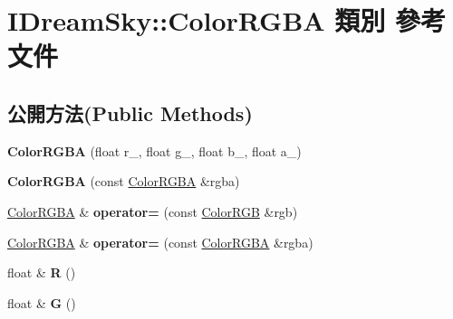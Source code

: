 \hypertarget{class_i_dream_sky_1_1_color_r_g_b_a}{}\section{I\+Dream\+Sky\+:\+:Color\+R\+G\+BA 類別 參考文件}
\label{class_i_dream_sky_1_1_color_r_g_b_a}
\subsection*{公開方法(Public Methods)}
\begin{DoxyCompactItemize}
\item 
{\bfseries Color\+R\+G\+BA} (float r\+\_, float g\+\_, float b\+\_, float a\+\_)\hypertarget{class_i_dream_sky_1_1_color_r_g_b_a_a296f9c79c535b7221eddbcc1decaf15a}{}\label{class_i_dream_sky_1_1_color_r_g_b_a_a296f9c79c535b7221eddbcc1decaf15a}

\item 
{\bfseries Color\+R\+G\+BA} (const \hyperlink{class_i_dream_sky_1_1_color_r_g_b_a}{Color\+R\+G\+BA} \&rgba)\hypertarget{class_i_dream_sky_1_1_color_r_g_b_a_aae8dea40c9c169a5a9e8df856fdfc714}{}\label{class_i_dream_sky_1_1_color_r_g_b_a_aae8dea40c9c169a5a9e8df856fdfc714}

\item 
\hyperlink{class_i_dream_sky_1_1_color_r_g_b_a}{Color\+R\+G\+BA} \& {\bfseries operator=} (const \hyperlink{class_i_dream_sky_1_1_color_r_g_b}{Color\+R\+GB} \&rgb)\hypertarget{class_i_dream_sky_1_1_color_r_g_b_a_aac80b182c20e5e2b68d3495d078f1b3c}{}\label{class_i_dream_sky_1_1_color_r_g_b_a_aac80b182c20e5e2b68d3495d078f1b3c}

\item 
\hyperlink{class_i_dream_sky_1_1_color_r_g_b_a}{Color\+R\+G\+BA} \& {\bfseries operator=} (const \hyperlink{class_i_dream_sky_1_1_color_r_g_b_a}{Color\+R\+G\+BA} \&rgba)\hypertarget{class_i_dream_sky_1_1_color_r_g_b_a_a6842401a78acc9e6f34cbe0cb7dbe526}{}\label{class_i_dream_sky_1_1_color_r_g_b_a_a6842401a78acc9e6f34cbe0cb7dbe526}

\item 
float \& {\bfseries R} ()\hypertarget{class_i_dream_sky_1_1_color_r_g_b_a_aee0873a7fdfbf2fc3b6fd989bfe6d95d}{}\label{class_i_dream_sky_1_1_color_r_g_b_a_aee0873a7fdfbf2fc3b6fd989bfe6d95d}

\item 
float \& {\bfseries G} ()\hypertarget{class_i_dream_sky_1_1_color_r_g_b_a_ac08a23864ed6a7cc984b7f46653df86c}{}\label{class_i_dream_sky_1_1_color_r_g_b_a_ac08a23864ed6a7cc984b7f46653df86c}


\end{DoxyCompactItemize}

